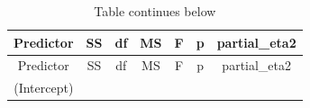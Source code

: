 \documentclass[
]{book}
\begin{document}
\begin{longtable}[]{@{}ccccccc@{}}
\caption{Table continues below}\tabularnewline
\toprule
\begin{minipage}[b]{0.21\columnwidth}\centering
Predictor\strut
\end{minipage} & \begin{minipage}[b]{0.11\columnwidth}\centering
SS\strut
\end{minipage} & \begin{minipage}[b]{0.07\columnwidth}\centering
df\strut
\end{minipage} & \begin{minipage}[b]{0.11\columnwidth}\centering
MS\strut
\end{minipage} & \begin{minipage}[b]{0.09\columnwidth}\centering
F\strut
\end{minipage} & \begin{minipage}[b]{0.07\columnwidth}\centering
p\strut
\end{minipage} & \begin{minipage}[b]{0.15\columnwidth}\centering
partial\_eta2\strut
\end{minipage}\tabularnewline
\midrule
\endfirsthead
\toprule
\begin{minipage}[b]{0.21\columnwidth}\centering
Predictor\strut
\end{minipage} & \begin{minipage}[b]{0.11\columnwidth}\centering
SS\strut
\end{minipage} & \begin{minipage}[b]{0.07\columnwidth}\centering
df\strut
\end{minipage} & \begin{minipage}[b]{0.11\columnwidth}\centering
MS\strut
\end{minipage} & \begin{minipage}[b]{0.09\columnwidth}\centering
F\strut
\end{minipage} & \begin{minipage}[b]{0.07\columnwidth}\centering
p\strut
\end{minipage} & \begin{minipage}[b]{0.15\columnwidth}\centering
partial\_eta2\strut
\end{minipage}\tabularnewline
\midrule
\endhead
\begin{minipage}[t]{0.21\columnwidth}\centering
(Intercept)\strut
\end{minipage} & \begin{minipage}[t]{0.11\columnwidth}\centering

\end{minipage}
\end{longtable}
\end{document}

